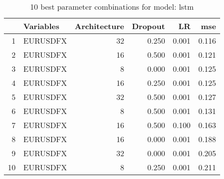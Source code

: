 \begin{table}[ht]
\centering
\begin{tabular}{rlrrrr}
  \hline
 & Variables & Architecture & Dropout & LR & mse \\ 
  \hline
1 & EURUSDFX &   32 & 0.250 & 0.001 & 0.116 \\ 
  2 & EURUSDFX &   16 & 0.500 & 0.001 & 0.121 \\ 
  3 & EURUSDFX &    8 & 0.000 & 0.001 & 0.125 \\ 
  4 & EURUSDFX &   16 & 0.250 & 0.001 & 0.125 \\ 
  5 & EURUSDFX &   32 & 0.500 & 0.001 & 0.127 \\ 
  6 & EURUSDFX &    8 & 0.500 & 0.001 & 0.131 \\ 
  7 & EURUSDFX &   16 & 0.500 & 0.100 & 0.163 \\ 
  8 & EURUSDFX &   16 & 0.000 & 0.001 & 0.188 \\ 
  9 & EURUSDFX &   32 & 0.000 & 0.001 & 0.205 \\ 
  10 & EURUSDFX &    8 & 0.250 & 0.001 & 0.211 \\ 
   \hline
\end{tabular}
\caption{10 best parameter combinations for model: lstm} 
\label{tab:lstm_top_10}
\end{table}
